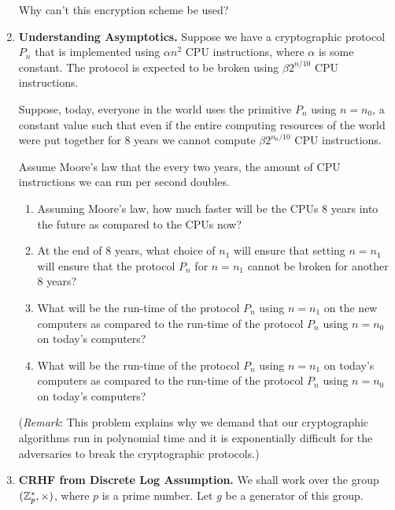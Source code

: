 \documentclass[11pt]{article}
\newcommand{\nextoddpage}{\checkoddpage\ifoddpage{\ \newpage\ \newpage}\else{\ \newpage}\fi}
\begin{document}
\begin{enumerate}
  Why can't this encryption scheme be used? 
  
  
  
   

\nextoddpage 
\item {\bfseries Understanding Asymptotics.} 
  Suppose we have a cryptographic protocol $P_n$ that is implemented using $\alpha n^2$ CPU instructions, where $\alpha$ is some constant.  
  The protocol is expected to be broken using $\beta 2^{n/10}$ CPU instructions. 
  
  Suppose, today, everyone in the world uses the primitive $P_n$ using $n=n_0$, a constant value such that even if the entire computing resources of the world were put together for 8 years we cannot compute $\beta 2^{n_0/10}$ CPU instructions. 
  
  Assume Moore's law that the every two years, the amount of CPU instructions we can run per second doubles. 
  
  \begin{enumerate}
  \item Assuming Moore's law, how much faster will be the CPUs 8 years into the future as compared to the CPUs now? 
  \item At the end of 8 years, what choice of $n_1$ will ensure that setting $n=n_1$ will ensure that the protocol $P_n$ for $n=n_1$ cannot be broken for another 8 years? 
  \item What will be the run-time of the protocol $P_n$ using $n=n_1$ on the new computers as compared to the run-time of the protocol $P_n$ using $n=n_0$ on today's computers? 
  \item What will be the run-time of the protocol $P_n$ using $n=n_1$ on today's computers as compared to the run-time of the protocol $P_n$ using $n=n_0$ on today's computers? 
  \end{enumerate}
  
  ({\footnotesize {\em Remark}: This problem explains why we demand that our cryptographic algorithms run in polynomial time and it is exponentially difficult for the adversaries to break the cryptographic protocols.})
    
    
    






\nextoddpage 
\item {\bfseries CRHF from Discrete Log Assumption.} 
  We shall work over the group $({\mathbb Z}_p^*,\times)$, where $p$ is a prime number. 
  Let $g$ be a generator of this group. 
  

\end{enumerate}
\end{document}
